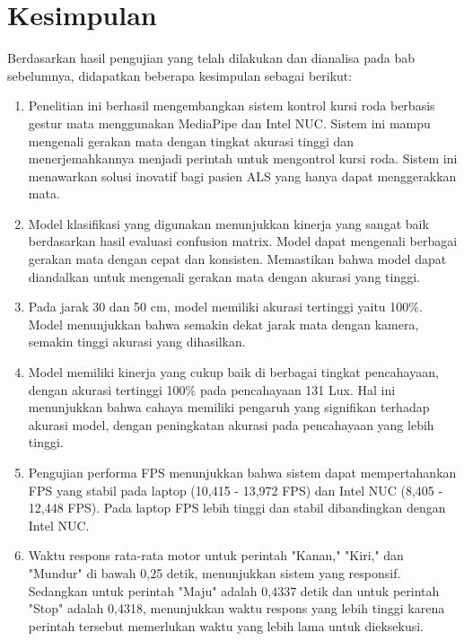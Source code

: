 \section{Kesimpulan}
\label{sec:kesimpulan}


Berdasarkan hasil pengujian yang telah dilakukan dan dianalisa pada bab sebelumnya, didapatkan beberapa kesimpulan sebagai berikut:

\begin{enumerate}

  \item Penelitian ini berhasil mengembangkan sistem kontrol kursi roda berbasis gestur mata menggunakan MediaPipe dan Intel NUC. Sistem ini mampu mengenali gerakan mata dengan tingkat akurasi tinggi dan menerjemahkannya menjadi perintah untuk mengontrol kursi roda. Sistem ini menawarkan solusi inovatif bagi pasien ALS yang hanya dapat menggerakkan mata.

  \item Model klasifikasi yang digunakan menunjukkan kinerja yang sangat baik berdasarkan hasil evaluasi confusion matrix. Model dapat mengenali berbagai gerakan mata dengan cepat dan konsisten. Memastikan bahwa model dapat diandalkan untuk mengenali gerakan mata dengan akurasi yang tinggi.

  \item Pada jarak 30 dan 50 cm, model memiliki akurasi tertinggi yaitu 100\%. Model menunjukkan bahwa semakin dekat jarak mata dengan kamera, semakin tinggi akurasi yang dihasilkan.

  \item Model memiliki kinerja yang cukup baik di berbagai tingkat pencahayaan, dengan akurasi tertinggi 100\% pada pencahayaan 131 Lux. Hal ini menunjukkan bahwa cahaya memiliki pengaruh yang signifikan terhadap akurasi model, dengan peningkatan akurasi pada pencahayaan yang lebih tinggi. 

  \item Pengujian performa FPS menunjukkan bahwa sistem dapat mempertahankan FPS yang stabil pada laptop (10,415 - 13,972 FPS) dan Intel NUC (8,405 - 12,448 FPS). Pada laptop FPS lebih tinggi dan stabil dibandingkan dengan Intel NUC. 
  
  \item Waktu respons rata-rata motor untuk perintah "Kanan," "Kiri," dan "Mundur" di bawah 0,25 detik, menunjukkan sistem yang responsif. Sedangkan untuk perintah "Maju" adalah 0,4337 detik dan untuk perintah "Stop" adalah 0,4318, menunjukkan waktu respons yang lebih tinggi karena perintah tersebut memerlukan waktu yang lebih lama untuk dieksekusi.
  

\end{enumerate}
